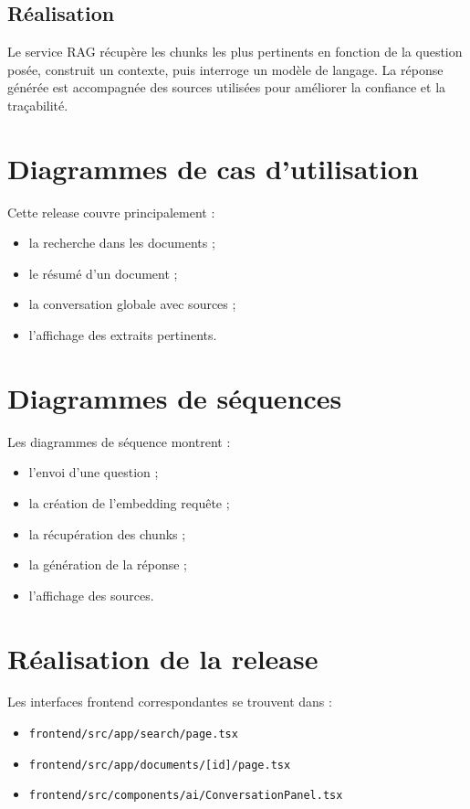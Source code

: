 \documentclass[12pt,a4paper]{report}
\begin{document}
\subsection{Réalisation}
Le service RAG récupère les chunks les plus pertinents en fonction de la question posée, construit un contexte, puis interroge un modèle de langage. La réponse générée est accompagnée des sources utilisées pour améliorer la confiance et la traçabilité.

\section{Diagrammes de cas d'utilisation}
Cette release couvre principalement :
\begin{itemize}
  \item la recherche dans les documents ;
  \item le résumé d'un document ;
  \item la conversation globale avec sources ;
  \item l'affichage des extraits pertinents.
\end{itemize}

\section{Diagrammes de séquences}
Les diagrammes de séquence montrent :
\begin{itemize}
  \item l'envoi d'une question ;
  \item la création de l'embedding requête ;
  \item la récupération des chunks ;
  \item la génération de la réponse ;
  \item l'affichage des sources.
\end{itemize}

\section{Réalisation de la release}
Les interfaces frontend correspondantes se trouvent dans :
\begin{itemize}
  \item \texttt{frontend/src/app/search/page.tsx}
  \item \texttt{frontend/src/app/documents/[id]/page.tsx}
  \item \texttt{frontend/src/components/ai/ConversationPanel.tsx}
\end{itemize}
\end{document}
